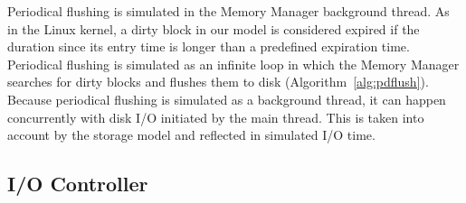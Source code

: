 \documentclass[conference]{IEEEtran}
\begin{document}
    Periodical flushing is simulated in the Memory Manager
    background thread. As in the Linux kernel, a dirty block
    in our model is considered expired if
    the duration since its entry time is longer than a
    predefined expiration time.
    Periodical flushing is simulated as an infinite loop in which
    the Memory Manager searches for dirty blocks and flushes them to disk (Algorithm~\ref{alg:pdflush}).
    Because periodical flushing is simulated as a background thread, it can happen concurrently
    with disk I/O initiated by the main thread. This is taken into account by the
    storage model and reflected in simulated I/O time.

    \subsection{I/O Controller}
\end{document}
